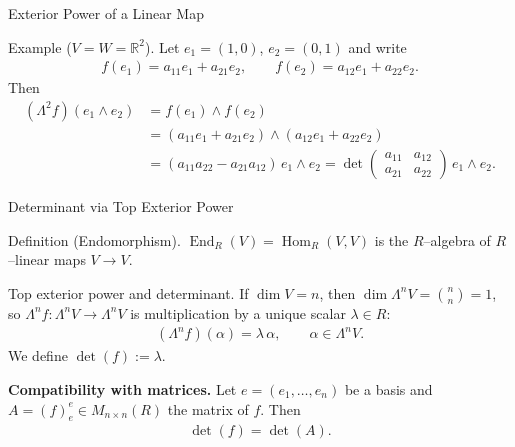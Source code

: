 \begin{frame}{Exterior Power of a Linear Map}

\begin{block}{Example ($V=W=\mathbb{R}^2$).}
Let $e_1=(1,0)$, $e_2=(0,1)$ and write
\begin{align*}
f(e_1)=a_{11}e_1+a_{21}e_2,\qquad f(e_2)=a_{12}e_1+a_{22}e_2.
\end{align*}
Then
\begin{align*}
(\Lambda^2 f)(e_1\wedge e_2)
&= f(e_1)\wedge f(e_2)\\
&=(a_{11}e_1+a_{21}e_2)\wedge (a_{12}e_1+a_{22}e_2)\\
&=(a_{11}a_{22}-a_{21}a_{12})\, e_1\wedge e_2
=\det\!\begin{pmatrix}a_{11}&a_{12}\\ a_{21}&a_{22}\end{pmatrix}\, e_1\wedge e_2.
\end{align*}
\end{block}
\end{frame}

\begin{frame}{Determinant via Top Exterior Power}
\vspace{-0.3cm}
\begin{block}{Definition (Endomorphism).}
$\operatorname{End}_R(V)=\operatorname{Hom}_R(V,V)$ is the $R$–algebra of $R$–linear maps $V\to V$.
\end{block}

\vspace{-0.3cm}
\begin{block}{Top exterior power and determinant.}
If $\dim V=n$, then $\dim\Lambda^{n}V=\binom{n}{n}=1$, so $\Lambda^{n}f:\Lambda^{n}V\to\Lambda^{n}V$ is multiplication by a unique scalar $\lambda\in R$:
\begin{align*}
(\Lambda^{n}f)(\alpha)=\lambda\,\alpha,\qquad \alpha\in\Lambda^{n}V.
\end{align*}
We define $\det(f):=\lambda$.

\textbf{Compatibility with matrices.}
Let $e=(e_1,\dots,e_n)$ be a basis and $A=(f)^e_e\in M_{n\times n}(R)$ the matrix of $f$. Then
\begin{align*}
\det(f)=\det(A).
\end{align*}
\end{block}
\end{frame}

